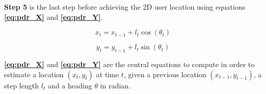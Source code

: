 \textbf{Step 5} is the last step before achieving the 2D user location using equations \textbf{\autoref{eq:pdr_X}} and \textbf{\autoref{eq:pdr_Y}}.

\begin{equation} \label{eq:pdr_X}
    x_t = x_{t - 1} + l_t\cos(\theta_t)
\end{equation}

\begin{equation} \label{eq:pdr_Y}
    y_t = y_{t - 1} + l_t\sin(\theta_t)
\end{equation}

\textbf{\autoref{eq:pdr_X}} and \textbf{\autoref{eq:pdr_Y}} are the central equations to compute in order to estimate a location $(x_t, y_t)$ at time $t$, given a previous location $(x_{t - 1}, y_{t - 1})$, a step length $l_t$ and a heading $\theta$ in radian.